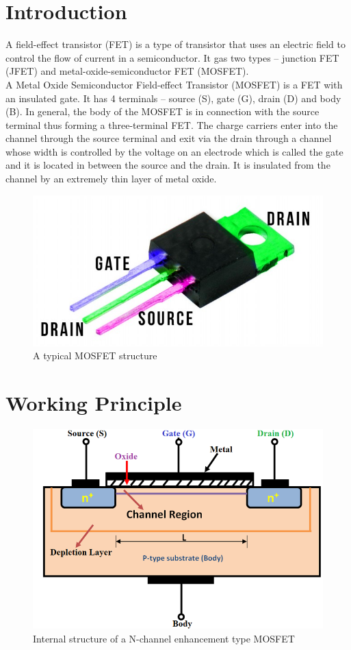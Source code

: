 \section*{Introduction}
A field-effect transistor (FET) is a type of transistor that uses an electric field to control the flow of current in a semiconductor. It gas two types -- junction FET (JFET) and metal-oxide-semiconductor FET (MOSFET). \\

A Metal Oxide Semiconductor Field-effect Transistor (MOSFET) is a FET with an insulated gate. It has 4 terminals -- source (S), gate (G), drain (D) and body (B). In general, the body of the MOSFET is in connection with the source terminal thus forming a three-terminal FET. The charge carriers enter into the channel through the source terminal and exit via the drain through a channel whose width is controlled by the voltage on an electrode which is called the gate and it is located in between the source and the drain. It is insulated from the channel by an extremely thin layer of metal oxide.

\begin{figure}[H]
    \centering
    \includegraphics[width=0.6\columnwidth]{images/real.jpg}
    \caption{A typical MOSFET structure}
\end{figure}

\section*{Working Principle}

\begin{figure}[H]
    \centering
    \includegraphics[width=0.75\columnwidth]{images/str.png}
    \caption{Internal structure of a N-channel enhancement type MOSFET}
    \label{str}
\end{figure}


